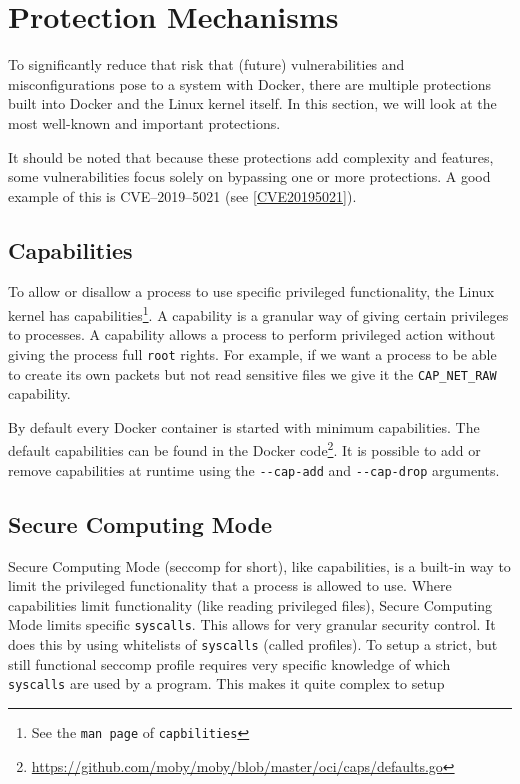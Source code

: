 \section{Protection Mechanisms}

To significantly reduce that risk that (future) vulnerabilities and misconfigurations pose to a system with Docker, there are multiple protections built into Docker and the Linux kernel itself. In this section, we will look at the most well-known and important protections.

\hfill

It should be noted that because these protections add complexity and features, some vulnerabilities focus solely on bypassing one or more protections. A good example of this is CVE--2019--5021 (see \autoref{CVE20195021}).

\subsection{Capabilities}\label{capabilities}
To allow or disallow a process to use specific privileged functionality, the Linux kernel has capabilities\footnote{See the \lstinline{man page} of \lstinline{capbilities}}. A capability is a granular way of giving certain privileges to processes. A capability allows a process to perform privileged action without giving the process full \lstinline{root} rights. For example, if we want a process to be able to create its own packets but not read sensitive files we give it the \lstinline{CAP_NET_RAW} capability.

\hfill

By default every Docker container is started with minimum capabilities. The default capabilities can be found in the Docker code\footnote{\url{https://github.com/moby/moby/blob/master/oci/caps/defaults.go}}. It is possible to add or remove capabilities at runtime using the \lstinline{--cap-add} and \lstinline{--cap-drop}\cite{More-Secure-Non-Root-Container} arguments.

\subsection{Secure Computing Mode}
Secure Computing Mode (seccomp for short), like capabilities, is a built-in way to limit the privileged functionality that a process is allowed to use. Where capabilities limit functionality (like reading privileged files), Secure Computing Mode limits specific \lstinline{syscalls}. This allows for very granular security control. It does this by using whitelists of \lstinline{syscalls} (called profiles).
To setup a strict, but still functional seccomp profile requires very specific knowledge of which \lstinline{syscalls} are used by a program. This makes it quite complex to setup

